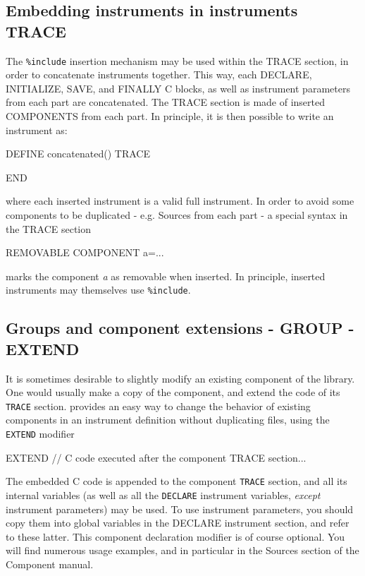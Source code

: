 \subsection{Embedding instruments in instruments TRACE}
\label{s:instrdefs-include-instr}
The \texttt{\%include} insertion mechanism may be used within the TRACE section,
in order to concatenate instruments together. This way, each DECLARE,
INITIALIZE, SAVE, and FINALLY C blocks, as well as instrument parameters from
each part are concatenated. The TRACE section is made of inserted COMPONENTS
from each part. In principle, it is then possible to write an instrument as:
\begin{mcstas}
DEFINE concatenated()
TRACE


END
\end{mcstas}
where each inserted instrument is a valid full instrument. In order to avoid
some components to be duplicated - e.g. Sources from each part - a special
syntax in the TRACE section
\begin{mcstas}
REMOVABLE COMPONENT a=...
\end{mcstas}
marks the component \textit{a} as removable when inserted. In principle, inserted
instruments may themselves use \texttt{\%include}.

\subsection{Groups and component extensions - GROUP - EXTEND}
\label{s:instrdefs-extend-group}

It is sometimes desirable to slightly modify an existing component of the \MCS library. One would usually make a copy of the component, and extend the code of its \texttt{TRACE} section. \MCS provides an easy way to change the behavior of existing components in an instrument definition without duplicating files, using the \texttt{EXTEND} modifier
\begin{mcstas}
EXTEND
// C code executed after the component TRACE section...
\end{mcstas} 
The embedded C code is appended to the
component \texttt{TRACE} section, and all its internal variables (as well as all
the \texttt{DECLARE} instrument variables, \emph{except} instrument parameters)
may be used. To use instrument parameters, you should copy them into global
variables in the DECLARE instrument section, and refer to these latter.  This
component declaration modifier is of course optional. You will find numerous
usage examples, and in particular in the Sources section of the Component
manual.

